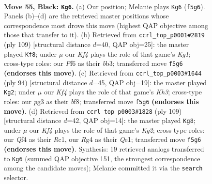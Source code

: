 \documentclass[11pt]{article}
\begin{document}
\clearpage

\begin{figure}[p]\centering
\begin{subfigure}{0.46\textwidth}\centering
\resizebox{\linewidth}{!}{%
\newchessgame
\chessboard[
  setfen={8/8/5p2/3p1k2/5qr1/Q5P1/P5KP/8 b - - 5 55},
  showmover=false,
  pgfstyle=straightmove, color=movearrow, markmove={f5-g6}
]}
\caption{}
\end{subfigure}\hfill
\begin{subfigure}{0.46\textwidth}\centering
\resizebox{\linewidth}{!}{%
\newchessgame
\chessboard[
  setfen={3r2k1/3P3p/8/6q1/3Q1p2/1B5P/5PPK/8 b - - 4 55},
  showmover=false,
  pgfstyle=straightmove, color=movearrow, markmove={g8-f8}
]}
\caption{}
\end{subfigure}
\\[4pt]
\begin{subfigure}{0.46\textwidth}\centering
\resizebox{\linewidth}{!}{%
\newchessgame
\chessboard[
  setfen={1R3bk1/5p2/7p/7p/5Q2/6PK/8/3q4 w - - 6 48},
  showmover=false,
  pgfstyle=straightmove, color=movearrow, markmove={h3-g2}
]}
\caption{}
\end{subfigure}\hfill
\begin{subfigure}{0.46\textwidth}\centering
\resizebox{\linewidth}{!}{%
\newchessgame
\chessboard[
  setfen={8/4Q1k1/7p/8/8/Pp2P2P/6PK/2r1q3 b - - 3 55},
  showmover=false,
  pgfstyle=straightmove, color=movearrow, markmove={g7-g8}
]}
\caption{}
\end{subfigure}
\caption{\textbf{Move 55, Black: \texttt{Kg6}.} (a) Our position; Melanie plays \texttt{Kg6} (\texttt{f5g6}). Panels (b)--(d) are the retrieved master positions whose correspondence most drove this move (highest QAP objective among those that transfer to it). (b) Retrieved from \texttt{ccrl\_top\_p0001\#2819} (ply 109) [structural distance $d$=40, QAP obj=25]: the master played \texttt{Kf8}; under $\mu$ our \emph{Kf4} plays the role of that game's \emph{Kg1}; cross-type roles: our \emph{P}f6 as their \emph{b}b3; transferred move \texttt{f5g6} \textbf{(endorses this move)}. (c) Retrieved from \texttt{ccrl\_top\_p0003\#1644} (ply 94) [structural distance $d$=45, QAP obj=19]: the master played \texttt{Kg2}; under $\mu$ our \emph{Kf4} plays the role of that game's \emph{Kh3}; cross-type roles: our \emph{p}g3 as their \emph{b}f8; transferred move \texttt{f5g6} \textbf{(endorses this move)}. (d) Retrieved from \texttt{ccrl\_top\_p0003\#1828} (ply 109) [structural distance $d$=42, QAP obj=14]: the master played \texttt{Kg8}; under $\mu$ our \emph{Kf4} plays the role of that game's \emph{Kg2}; cross-type roles: our \emph{Q}f4 as their \emph{R}c1, our \emph{R}g4 as their \emph{Q}e1; transferred move \texttt{f5g6} \textbf{(endorses this move)}. Synthesis: 19 retrieved analogs transferred to \texttt{Kg6} (summed QAP objective 151, the strongest correspondence among the candidate moves); Melanie committed it via the \texttt{search} selector.}
\label{fig:thought-m109}
\end{figure}
\end{document}
